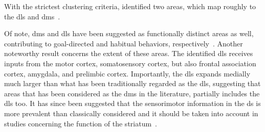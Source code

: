 With the strictest clustering criteria, \citeauthor{Hunnicutt2016} identified two areas, which map roughly to the \gls{dls} and \gls{dms}\footnotemark~\cite{Hunnicutt2016}.

Of note, \gls{dms} and \gls{dls} have been suggested as functionally distinct areas as well, contributing to goal-directed and habitual behaviors, respectively~\cite{Yin2006NatRevNeurosci}.
Another noteworthy result concerns the extent of these areas.
The identified \gls{dls} receives inputs from the motor cortex, somatosensory cortex, but also frontal association cortex, amygdala, and prelimbic cortex.
Importantly, the \gls{dls} expands medially much larger than what has been traditionally regarded as the \gls{dls}, suggesting that areas that has been considered as the \gls{dms} in the literature, partially includes the \gls{dls} too.
It has since been suggested that the sensorimotor information in the \gls{ds} is more prevalent than classically considered and it should be taken into account in studies concerning the function of the striatum~\cite{Robbe2018}.


